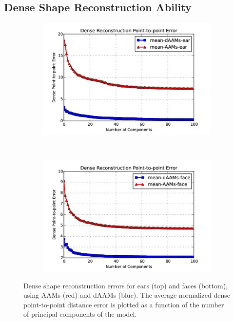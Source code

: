 \subsection{Dense Shape Reconstruction Ability}

\begin{figure}[!t]
    \centering
    \begin{subfigure}[b]{\columnwidth}
            \includegraphics[width=\textwidth,trim={0 0 0 25pt},clip]{resources/Annotation_Correction/Suplementory_Meterial/Model_Analysis/sr_ear}
    \end{subfigure}
    \\
    \begin{subfigure}[b]{\columnwidth}
            \includegraphics[width=\textwidth,trim={0 0 0 25pt},clip]{resources/Annotation_Correction/Suplementory_Meterial/Model_Analysis/sr_face}
    \end{subfigure}
    \caption{Dense shape reconstruction errors for ears (top) and faces (bottom), using AAMs (red) and dAAMs (blue). The average normalized dense point-to-point distance error is plotted as a function of the number of principal components of the model.}
    \label{fig:rc_face}
\end{figure}

